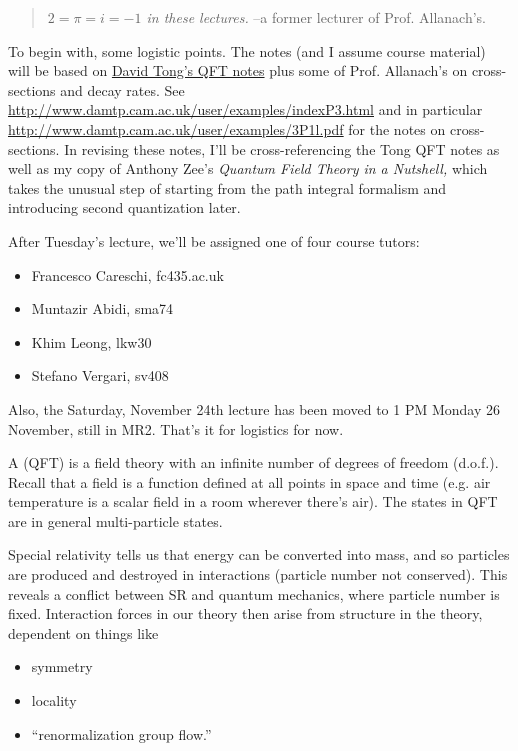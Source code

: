 \begin{quote}\textit{$2=\pi=i=-1$ in these lectures.} --a former lecturer of Prof. Allanach's.\end{quote}
To begin with, some logistic points. The notes (and I assume course material) will be based on \href{http://www.damtp.cam.ac.uk/user/tong/qft/qft.pdf}{David Tong's QFT notes} plus some of Prof. Allanach's on cross-sections and decay rates. See \url{http://www.damtp.cam.ac.uk/user/examples/indexP3.html} and in particular \url{http://www.damtp.cam.ac.uk/user/examples/3P1l.pdf} for the notes on cross-sections. In revising these notes, I'll be cross-referencing the Tong QFT notes as well as my copy of Anthony Zee's \textit{Quantum Field Theory in a Nutshell,} which takes the unusual step of starting from the path integral formalism and introducing second quantization later.

After Tuesday's lecture, we'll be assigned one of four course tutors:
\begin{itemize}
    \item Francesco Careschi, fc435\@cam.ac.uk
    \item Muntazir Abidi, sma74
    \item Khim Leong, lkw30
    \item Stefano Vergari, sv408
\end{itemize}
Also, the Saturday, November 24th lecture has been moved to 1 PM Monday 26 November, still in MR2. That's it for logistics for now.

\begin{defn}
A  (QFT) is a field theory with an infinite number of degrees of freedom (d.o.f.). Recall that a field is a function defined at all points in space and time (e.g. air temperature is a scalar field in a room wherever there's air). The states in QFT are in general multi-particle states.
\end{defn}
Special relativity tells us that energy can be converted into mass, and so particles are produced and destroyed in interactions (particle number not conserved). This reveals a conflict between SR and quantum mechanics, where particle number is fixed. Interaction forces in our theory then arise from structure in the theory, dependent on things like
\begin{itemize}
    \item symmetry
    \item locality
    \item ``renormalization group flow.''
\end{itemize}

